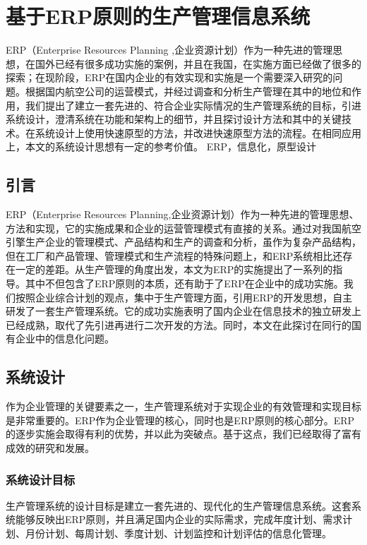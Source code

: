 \chapter{基于ERP原则的生产管理信息系统}

\ECUSTabstract ERP（Enterprise Resources Planning ,企业资源计划）作为一种先进的管理思想，在国外已经有很多成功实施的案例，并且在我国，在实施方面已经做了很多的探索；在现阶段，ERP在国内企业的有效实现和实施是一个需要深入研究的问题。根据国内航空公司的运营模式，并经过调查和分析生产管理在其中的地位和作用，我们提出了建立一套先进的、符合企业实际情况的生产管理系统的目标，引进系统设计，澄清系统在功能和架构上的细节，并且探讨设计方法和其中的关键技术。在系统设计上使用快速原型的方法，并改进快速原型方法的流程。在相同应用上，本文的系统设计思想有一定的参考价值。
\ECUSTkeywords ERP，信息化，原型设计

\section{引言}

ERP（Enterprise Resources Planning,企业资源计划）作为一种先进的管理思想、方法和实现，它的实施成果和企业的运营管理模式有直接的关系。通过对我国航空引擎生产企业的管理模式、产品结构和生产的调查和分析，虽作为复杂产品结构，但在工厂和产品管理、管理模式和生产流程的特殊问题上，和ERP系统相比还存在一定的差距。从生产管理的角度出发，本文为ERP的实施提出了一系列的指导。其中不但包含了ERP原则的本质，还有助于了ERP在企业中的成功实施。我们按照企业综合计划的观点，集中于生产管理方面，引用ERP的开发思想，自主研发了一套生产管理系统。它的成功实施表明了国内企业在信息技术的独立研发上已经成熟，取代了先引进再进行二次开发的方法。同时，本文在此探讨在同行的国有企业中的信息化问题。

\section{系统设计}

作为企业管理的关键要素之一，生产管理系统对于实现企业的有效管理和实现目标是非常重要的。ERP作为企业管理的核心，同时也是ERP原则的核心部分。ERP的逐步实施会取得有利的优势，并以此为突破点。基于这点，我们已经取得了富有成效的研究和发展。

\subsection{系统设计目标}

生产管理系统的设计目标是建立一套先进的、现代化的生产管理信息系统。这套系统能够反映出ERP原则，并且满足国内企业的实际需求，完成年度计划、需求计划、月份计划、每周计划、季度计划、计划监控和计划评估的信息化管理。

